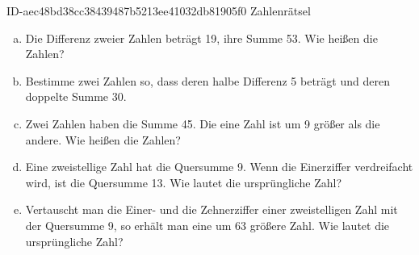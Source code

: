 \begin{exercise}
      {ID-aec48bd38cc38439487b5213ee41032db81905f0}
      {Zahlenrätsel}
  \ifproblem\problem
    \begin{enumerate}[a)]
      \item Die Differenz zweier Zahlen beträgt 19, ihre Summe 53. Wie heißen
            die Zahlen?
      \item Bestimme zwei Zahlen so, dass deren halbe Differenz 5 beträgt und deren
            doppelte Summe 30.
      \item Zwei Zahlen haben die Summe 45. Die eine Zahl ist um 9 größer als die andere.
            Wie heißen die Zahlen?
      \item Eine zweistellige Zahl hat die Quersumme 9. Wenn die Einerziffer verdreifacht
            wird, ist die Quersumme 13. Wie lautet die ursprüngliche Zahl?
      \item Vertauscht man die Einer- und die Zehnerziffer einer zweistelligen Zahl mit
            der Quersumme 9, so erhält man eine um 63 größere Zahl. Wie lautet die
            ursprüngliche Zahl?
    \end{enumerate}
  \fi
\end{exercise}
